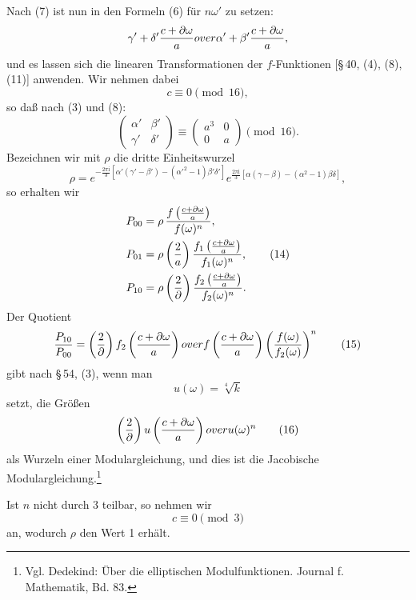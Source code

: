\documentclass[11pt]{article}
\providecommand{\ii}{\mathrm{i}}
\begin{document}
Nach (7) ist nun in den Formeln (6) für $n\omega'$ zu setzen:
\[
 {\gamma'+\delta'{c+\partial\omega\over a}
over
 \alpha'+\beta'{c+\partial\omega\over a}},
\]
und es lassen sich die linearen Transformationen der $f$-Funktionen [\S\,40, (4), (8),
(11)] anwenden. Wir nehmen dabei
\begin{equation}
 c\equiv0\pmod{16},
\tag{12}
\end{equation}
so daß nach (3) und (8):
\[
 \begin{pmatrix}\alpha'&\beta'\\ \gamma'&\delta'\end{pmatrix}
 \equiv
 \begin{pmatrix}a^3&0\\0&a\end{pmatrix}\pmod{16}.
\]
Bezeichnen wir mit $\rho$ die dritte Einheitswurzel
\begin{equation}
 \rho=e^{-\frac{2\pi\ii}{3}[\alpha'(\gamma'-\beta')-(\alpha'^2-1)\beta'\delta']}
 e^{\frac{2\pi\ii}{3}[\alpha(\gamma-\beta)-(\alpha^2-1)\beta\delta]},
\tag{13}
\end{equation}
so erhalten wir
\begin{align}
 P_{00}&=\rho\,{f\left({c+\partial\omega\over a}\right)\over f(\omega)^n},\notag\\
 P_{01}&=\rho\left({2\over a}\right)
 {f_1\left({c+\partial\omega\over a}\right)\over f_1(\omega)^n},
\tag{14}\\
 P_{10}&=\rho\left({2\over \partial}\right)
 {f_2\left({c+\partial\omega\over a}\right)\over f_2(\omega)^n}.\notag
\end{align}
Der Quotient
\begin{equation}
 {P_{10}\over P_{00}}=
 \left({2\over\partial}\right)
 {f_2\left({c+\partial\omega\over a}\right)
over f\left({c+\partial\omega\over a}\right)}
 \left({f(\omega)\over f_2(\omega)}\right)^n
\tag{15}
\end{equation}
gibt nach \S\,54, (3), wenn man
\[
 u(\omega)=\sqrt[4]{k}
\]
setzt, die Größen
\begin{equation}
 \left({2\over\partial}\right)
 {u\left({c+\partial\omega\over a}\right)
over u(\omega)^n}
\tag{16}
\end{equation}
als Wurzeln einer Modulargleichung, und dies ist die Jacobische Modulargleichung.\footnote{Vgl. Dedekind: Über die elliptischen Modulfunktionen. Journal f. Mathematik, Bd. 83.}

Ist $n$ nicht durch $3$ teilbar, so nehmen wir
\begin{equation}
 c\equiv0\pmod 3
\tag{17}
\end{equation}
an, wodurch $\rho$ den Wert 1 erhält.
\end{document}
